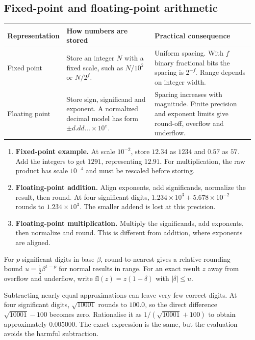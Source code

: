 \documentclass[12pt,a4paper]{article}
\begin{document}
\subsection{Fixed-point and floating-point arithmetic}
\par\vspace{5pt}
\begingroup
\setlength{\extrarowheight}{1pt}
\noindent\begin{tabularx}{\linewidth}{|B{3.1cm}|Y|Y|}
\hline
\textbf{Representation} & \textbf{How numbers are stored} & \textbf{Practical consequence} \\ \hline
Fixed point & Store an integer $N$ with a fixed scale, such as $N/10^2$ or $N/2^f$. & Uniform spacing. With $f$ binary fractional bits the spacing is $2^{-f}$. Range depends on integer width. \\ \hline
Floating point & Store sign, significand and exponent. A normalized decimal model has form $\pm d.dd\ldots\times10^e$. & Spacing increases with magnitude. Finite precision and exponent limits give round-off, overflow and underflow. \\ \hline
\end{tabularx}\par
\endgroup
\begin{enumerate}[leftmargin=*, itemsep=3pt, topsep=4pt]
  \item \textbf{Fixed-point example.} At scale $10^{-2}$, store $12.34$ as $1234$ and $0.57$ as $57$. Add the integers to get $1291$, representing $12.91$. For multiplication, the raw product has scale $10^{-4}$ and must be rescaled before storing.
  \item \textbf{Floating-point addition.} Align exponents, add significands, normalize the result, then round. At four significant digits, $1.234\times10^3+5.678\times10^{-2}$ rounds to $1.234\times10^3$. The smaller addend is lost at this precision.
  \item \textbf{Floating-point multiplication.} Multiply the significands, add exponents, then normalize and round. This is different from addition, where exponents are aligned.
\end{enumerate}
For $p$ significant digits in base $\beta$, round-to-nearest gives a relative rounding bound $u=\tfrac12\beta^{1-p}$ for normal results in range. For an exact result $z$ away from overflow and underflow, write $\mathrm{fl}(z)=z(1+\delta)$ with $|\delta|\le u$.
\begin{tcolorbox}[masonbox, title={Cancellation}]
Subtracting nearly equal approximations can leave very few correct digits. At four significant digits, $\sqrt{10001}$ rounds to $100.0$, so the direct difference $\sqrt{10001}-100$ becomes zero. Rationalise it as $1/(\sqrt{10001}+100)$ to obtain approximately $0.005000$. The exact expression is the same, but the evaluation avoids the harmful subtraction.
\end{tcolorbox}
\end{document}
